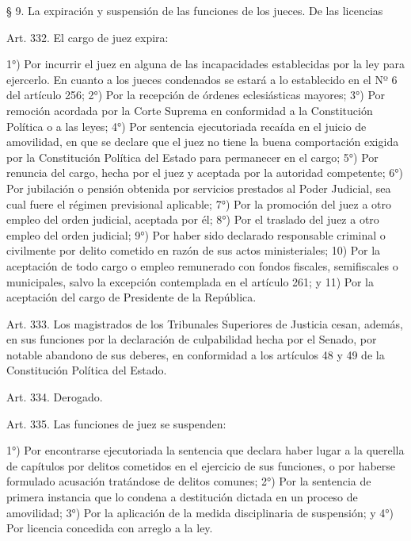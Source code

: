     § 9. La expiración y suspensión de las funciones de los jueces. De las licencias


    Art. 332. El cargo de juez expira:

    1°) Por incurrir el juez en alguna de las incapacidades establecidas por la ley para ejercerlo.
    En cuanto a los jueces condenados se estará a lo establecido en el Nº 6 del artículo 256;
    2°) Por la recepción de órdenes eclesiásticas mayores;
    3°) Por remoción acordada por la Corte Suprema en conformidad a la Constitución Política o a las leyes;
    4°) Por sentencia ejecutoriada recaída en el juicio de amovilidad, en que se declare que el juez no tiene la buena comportación exigida por la Constitución Política del Estado para permanecer en el cargo;
    5°) Por renuncia del cargo, hecha por el juez y aceptada por la autoridad competente;
    6°) Por jubilación o pensión obtenida por servicios prestados al Poder Judicial, sea cual fuere el régimen previsional aplicable;
    7°) Por la promoción del juez a otro empleo del orden judicial, aceptada por él;
    8°) Por el traslado del juez a otro empleo del orden judicial;
    9°) Por haber sido declarado responsable criminal o civilmente por delito cometido en razón de sus actos ministeriales;
    10) Por la aceptación de todo cargo o empleo remunerado con fondos fiscales, semifiscales o municipales, salvo la excepción contemplada en el artículo 261; y
    11) Por la aceptación del cargo de Presidente de la República.


    Art. 333. Los magistrados de los Tribunales Superiores de Justicia cesan, además, en sus funciones por la declaración de culpabilidad hecha por el Senado, por notable abandono de sus deberes, en conformidad a los artículos 48 y 49 de la Constitución Política del Estado.


    Art. 334. Derogado.




    Art. 335. Las funciones de juez se suspenden:

    1°) Por encontrarse ejecutoriada la sentencia que declara haber lugar a la querella de capítulos por delitos cometidos en el ejercicio de sus funciones, o por haberse formulado acusación tratándose de delitos comunes;
    2°) Por la sentencia de primera instancia que lo condena a destitución dictada en un proceso de amovilidad;
    3°) Por la aplicación de la medida disciplinaria de suspensión; y
    4°) Por licencia concedida con arreglo a la ley.



